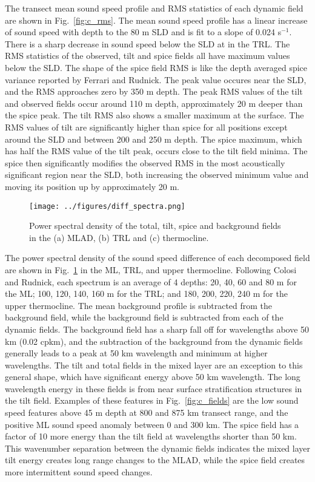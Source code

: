 \documentclass[preprint,NumberedRefs]{JASA}
\begin{document}
The transect mean sound speed profile and RMS statistics of each dynamic field are shown in Fig.~\ref{fig:c_rms}. The mean sound speed profile has a linear increase of sound speed with depth to the 80 m SLD and is fit to a slope of 0.024 s$^{-1}$. There is a sharp decrease in sound speed below the SLD at in the TRL. The RMS statistics of the observed, tilt and spice fields all have maximum values below the SLD. The shape of the spice field RMS is like the depth averaged spice variance reported by Ferrari and Rudnick\citep{ferrari2000}. The peak value occures near the SLD, and the RMS approaches zero by 350 m depth. The peak RMS values of the tilt and observed fields occur around 110 m depth, approximately 20 m deeper than the spice peak. The tilt RMS also shows a smaller maximum at the surface. The RMS values of tilt are significantly higher than spice for all positions except around the SLD and between 200 and 250 m depth. The spice maximum, which has half the RMS value of the tilt peak, occurs close to the tilt field minima. The spice then significantly modifies the observed RMS in the most acoustically significant region near the SLD, both increasing the observed minimum value and moving its position up by approximately 20 m.

\begin{figure}
\texttt{[image: ../figures/diff\_spectra.png]}
        \caption{\label{fig:spectra}{Power spectral density of the total, tilt, spice and background fields in the (a) MLAD, (b) TRL and (c) thermocline.}}
\end{figure}
The power spectral density of the sound speed difference of each decomposed field are shown in Fig.~\ref{fig:spectra} in the ML, TRL, and upper thermocline. Following Colosi and Rudnick\cite{colosi2020observations}, each spectrum is an average of 4 depths: 20, 40, 60 and 80 m for the ML; 100, 120, 140, 160 m for the TRL; and 180, 200, 220, 240 m for the upper thermocline. The mean background profile is subtracted from the background field, while the background field is subtracted from each of the dynamic fields. The background field has a sharp fall off for wavelengths above 50 km (0.02 cpkm), and the subtraction of the background from the dynamic fields generally leads to a peak at 50 km wavelength and minimum at higher wavelengths. The tilt and total fields in the mixed layer are an exception to this general shape, which have significant energy above 50 km wavelength. The long wavelength energy in these fields is from near surface stratification structures in the tilt field. Examples of these features in Fig.~\ref{fig:c_fields} are the low sound speed features above 45 m depth at 800 and 875 km transect range, and the positive ML sound speed anomaly between 0 and 300 km. The spice field has a factor of 10 more energy than the tilt field at wavelengths shorter than 50 km. This wavenumber separation between the dynamic fields indicates the mixed layer tilt energy creates long range changes to the MLAD, while the spice field creates more intermittent sound speed changes.
\end{document}
